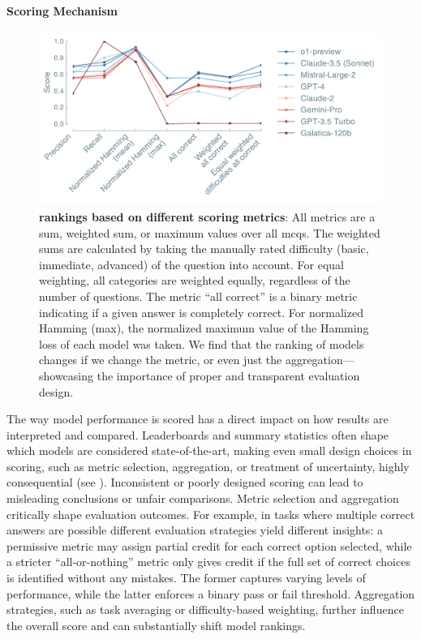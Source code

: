 \paragraph{Scoring Mechanism} 

\begin{figure}
    \centering
    \label{fig:scoring}
    \includegraphics[width=1\textwidth]{figures/final_figures/chembench_scoring.pdf}
    \caption{\textbf{ \autocite{mirza2024large} rankings based on different scoring metrics}: All metrics are a sum, weighted sum, or maximum values over all \glspl{mcq}. The weighted sums are calculated by taking the manually rated difficulty (basic, immediate, advanced) of the question into account. For equal weighting, all categories are weighted equally, regardless of the number of questions. The metric \enquote{all correct} is a binary metric indicating if a given answer is completely correct. For normalized Hamming (max), the normalized maximum value of the Hamming loss of each model was taken. We find that the ranking of models changes if we change the metric, or even just the aggregation---showcasing the importance of proper and transparent evaluation design.}
\end{figure}

The way model performance is scored has a direct impact on how results are interpreted and compared. 
Leaderboards and summary statistics often shape which models are considered state-of-the-art, making even small design choices in scoring, such as metric selection, aggregation, or treatment of uncertainty, highly consequential (see ). 
Inconsistent or poorly designed scoring can lead to misleading conclusions or unfair comparisons.
Metric selection and aggregation critically shape evaluation outcomes. 
For example, in tasks where multiple correct answers are possible different evaluation strategies yield different insights: a permissive metric may assign partial credit for each correct option selected, while a stricter \enquote{all-or-nothing} metric only gives credit if the full set of correct choices is identified without any mistakes. The former captures varying levels of performance, while the latter enforces a binary pass or fail threshold. Aggregation strategies, such as task averaging or difficulty-based weighting, further influence the overall score and can substantially shift model rankings. 

